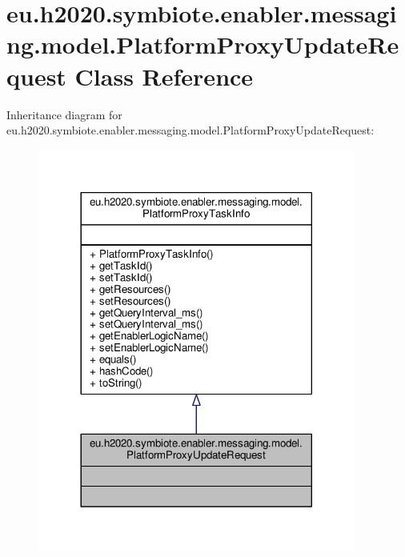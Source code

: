\hypertarget{classeu_1_1h2020_1_1symbiote_1_1enabler_1_1messaging_1_1model_1_1PlatformProxyUpdateRequest}{}\section{eu.\+h2020.\+symbiote.\+enabler.\+messaging.\+model.\+Platform\+Proxy\+Update\+Request Class Reference}
\label{classeu_1_1h2020_1_1symbiote_1_1enabler_1_1messaging_1_1model_1_1PlatformProxyUpdateRequest}


Inheritance diagram for eu.\+h2020.\+symbiote.\+enabler.\+messaging.\+model.\+Platform\+Proxy\+Update\+Request\+:\nopagebreak
\begin{figure}[H]
\begin{center}
\leavevmode
\includegraphics[width=296pt]{classeu_1_1h2020_1_1symbiote_1_1enabler_1_1messaging_1_1model_1_1PlatformProxyUpdateRequest__inherit__graph}
\end{center}
\end{figure}


